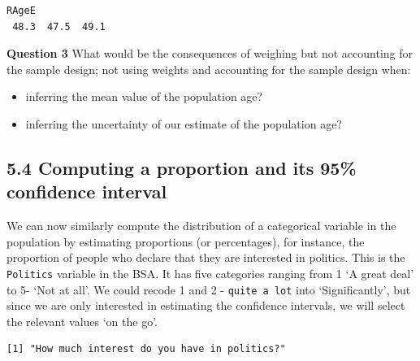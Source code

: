 \documentclass[
  14,
  a4paper,
  DIV=11,
  numbers=noendperiod]{scrartcl}
\newenvironment{Shaded}{\begin{snugshade}}{\end{snugshade}}
\newcommand{\DocumentationTok}[1]{\textcolor[rgb]{0.37,0.37,0.37}{\textit{#1}}}
\newcommand{\FunctionTok}[1]{\textcolor[rgb]{0.28,0.35,0.67}{#1}}
\newcommand{\NormalTok}[1]{\textcolor[rgb]{0.00,0.23,0.31}{#1}}
\newcommand{\SpecialCharTok}[1]{\textcolor[rgb]{0.37,0.37,0.37}{#1}}
\newcommand{\StringTok}[1]{\textcolor[rgb]{0.13,0.47,0.30}{#1}}
\providecommand{\tightlist}{%
  \setlength{\itemsep}{0pt}\setlength{\parskip}{0pt}}\usepackage{longtable,booktabs,array}
\begin{document}
\begin{verbatim}
RAgeE             
 48.3  47.5  49.1 
\end{verbatim}

\textbf{Question 3} What would be the consequences of weighing but not
accounting for the sample design; not using weights and accounting for
the sample design when:

\begin{itemize}
\tightlist
\item
  inferring the mean value of the population age?
\item
  inferring the uncertainty of our estimate of the population age?
\end{itemize}

\hypertarget{computing-a-proportion-and-its-95-confidence-interval}{%
\subsection{5.4 Computing a proportion and its 95\% confidence
interval}\label{computing-a-proportion-and-its-95-confidence-interval}}

We can now similarly compute the distribution of a categorical variable
in the population by estimating proportions (or percentages), for
instance, the proportion of people who declare that they are interested
in politics. This is the \texttt{Politics} variable in the BSA. It has
five categories ranging from 1 `A great deal' to 5- `Not at all'. We
could recode 1 and 2 - \texttt{quite\ a\ lot} into `Significantly', but
since we are only interested in estimating the confidence intervals, we
will select the relevant values `on the go'.

\begin{Shaded}
\end{Shaded}

\begin{verbatim}
[1] "How much interest do you have in politics?"
\end{verbatim}

\begin{Shaded}
\end{Shaded}
\end{document}
